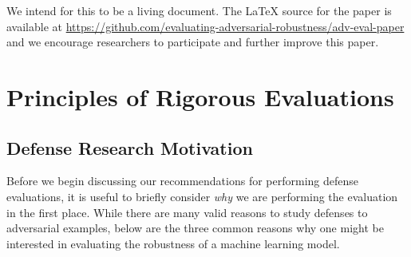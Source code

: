 \documentclass{article} %
\begin{document}
We intend for this to be a living document.
%
The LaTeX source for the paper is available at
\url{https://github.com/evaluating-adversarial-robustness/adv-eval-paper} and we encourage researchers to participate
and further improve this paper.

\newpage

\section{Principles of Rigorous Evaluations}
\label{sec:doing_good_science}

\subsection{Defense Research Motivation}
\label{sec:defense_research_motivation}

Before we begin discussing our recommendations for performing defense evaluations,
it is useful to briefly consider \emph{why} we are performing the evaluation in
the first place.
%
While there are many valid reasons to study defenses to adversarial examples, below are the
three common reasons why one might be interested in evaluating the
robustness of a machine learning model.
\end{document}
